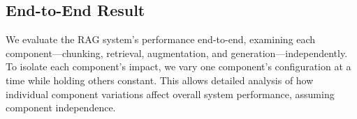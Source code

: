 

\subsection{End-to-End Result}
\label{subsec: e2e_result}
We evaluate the RAG system's performance end-to-end, examining each component—chunking, retrieval, augmentation, and generation—independently. To isolate each component's impact, we vary one component's configuration at a time while holding others constant. This allows detailed analysis of how individual component variations affect overall system performance, assuming component independence.

